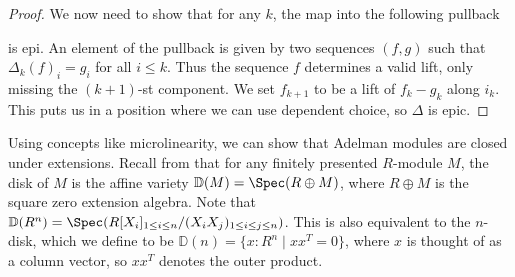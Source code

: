 \begin{proof}
  We now need to show that for any $k$, the map into the following pullback
  \begin{center}
  \end{center}
  is epi.
  An element of the pullback is given by two sequences $(f,g)$ such that $\Delta_k(f)_i = g_i$ for all $i \leq k$.
  Thus the sequence $f$ determines a valid lift, only missing the $(k+1)$-st component.
  We set $f_{k+1}$ to be a lift of $f_k - g_k$ along $i_k$.
  This puts us in a position where we can use dependent choice, so $\Delta$ is epic.

\end{proof}

Using concepts like microlinearity, we can show that Adelman modules are closed under extensions.
Recall from \cite{diffgeo-article} that for any finitely presented $R$-module $M$, the disk of $M$ is the affine variety $\mathbb{D}(M) = \Spec (R \oplus M)$, where $R \oplus M$ is the square zero extension algebra.
Note that
$\mathbb{D}(R^n) = \Spec (R[X_i]_{1\leq i \leq n}/(X_i X_j)_{1 \leq i \leq j \leq n})$.
This is also equivalent to the $n$-disk, which we define to be
$\mathbb{D}(n) = \{ x : R^n \mid xx^T = 0\}$,
where $x$ is thought of as a column vector, so $x x^T$ denotes the outer product.

